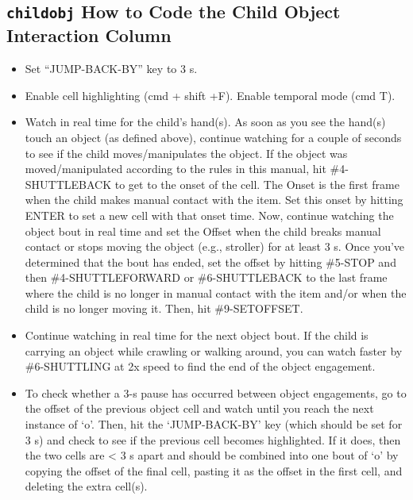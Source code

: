 \documentclass[
  12pt,
]{book}
\providecommand{\tightlist}{%
  \setlength{\itemsep}{0pt}\setlength{\parskip}{0pt}}
\begin{document}
\hypertarget{childobj-how-to-code-the-child-object-interaction-column}{%
\subsection*{\texorpdfstring{\texttt{childobj} How to Code the Child Object Interaction Column}{childobj How to Code the Child Object Interaction Column}}\label{childobj-how-to-code-the-child-object-interaction-column}}

\begin{itemize}
\tightlist
\item
  Set ``JUMP-BACK-BY'' key to 3 s.
\item
  Enable cell highlighting (cmd + shift +F). Enable temporal mode (cmd T).
\item
  Watch in real time for the child's hand(s). As soon as you see the hand(s) touch an object (as defined above), continue watching for a couple of seconds to see if the child moves/manipulates the object. If the object was moved/manipulated according to the rules in this manual, hit \#4-SHUTTLEBACK to get to the onset of the cell. The Onset is the first frame when the child makes manual contact with the item. Set this onset by hitting ENTER to set a new cell with that onset time. Now, continue watching the object bout in real time and set the Offset when the child breaks manual contact or stops moving the object (e.g., stroller) for at least 3 s. Once you've determined that the bout has ended, set the offset by hitting \#5-STOP and then \#4-SHUTTLEFORWARD or \#6-SHUTTLEBACK to the last frame where the child is no longer in manual contact with the item and/or when the child is no longer moving it. Then, hit \#9-SETOFFSET.
\item
  Continue watching in real time for the next object bout. If the child is carrying an object while crawling or walking around, you can watch faster by \#6-SHUTTLING at 2x speed to find the end of the object engagement.
\item
  To check whether a 3-s pause has occurred between object engagements, go to the offset of the previous object cell and watch until you reach the next instance of `o'. Then, hit the `JUMP-BACK-BY' key (which should be set for 3 s) and check to see if the previous cell becomes highlighted. If it does, then the two cells are \textless{} 3 s apart and should be combined into one bout of `o' by copying the offset of the final cell, pasting it as the offset in the first cell, and deleting the extra cell(s).
\end{itemize}
\end{document}

